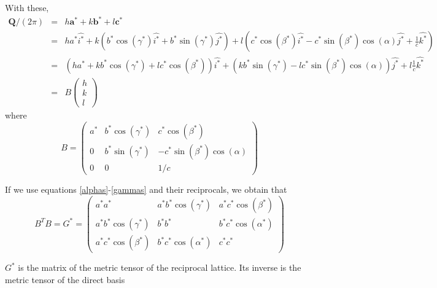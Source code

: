 \documentclass[prb]{revtex4}%
\begin{document}
With these,
\begin{eqnarray}
    \nonumber  \textbf{Q}/(2\pi) &=&  h \textbf{a}^* + k \textbf{b}^*+ l \textbf{c}^*\\
    \nonumber &=& h a^*\widehat{i^*} + k (b^* \cos(\gamma^*) \widehat{i^*} + b^* \sin(\gamma^*) \widehat{j^*}) + l (c^* \cos(\beta^*) \widehat{i^*} - c^* \sin(\beta^*) \cos(\alpha)\widehat{j^*} +
    \frac{1}{c}\widehat{k^*})\\
    \nonumber &=& (h a^* + k b^* \cos(\gamma^*) + l c^* \cos(\beta^*))\widehat{i^*} + (k b^* \sin(\gamma^*) - l c^* \sin(\beta^*) \cos(\alpha))\widehat{j^*} + l \frac{1}{c}\widehat{k^*}\\
    &=& B \left(\begin{array}{c}
                                                            h \\
                                                            k \\
                                                            l
                                                          \end{array}\right)
\end{eqnarray}
where
\begin{equation}
    B = \left(\begin{array}{ccc}
        a^* & b^* \cos(\gamma^*) & c^* \cos(\beta^*)\\
        0 & b^* \sin(\gamma^*) &- c^* \sin(\beta^*) \cos(\alpha) \\
        0 & 0 & 1/c
    \end{array}\right)
\end{equation}

If we use equations \ref{alphas}-\ref{gammas} and their reciprocals, we obtain that
\begin{equation}\label{mt1}
    B^T B = G^* = \left(\begin{array}{ccc}
        a^* a^* & a^* b^* \cos(\gamma^*) & a^* c^* \cos(\beta^*)\\
        a^* b^* \cos(\gamma^*) & b^* b^* & b^* c^* \cos(\alpha^*) \\
        a^* c^* \cos(\beta^*) & b^* c^* \cos(\alpha^*) &  c^* c^*
    \end{array}\right)
\end{equation}

$G^*$ is the matrix of the metric tensor of the reciprocal lattice. Its inverse is the metric tensor of the direct basis
\end{document}
